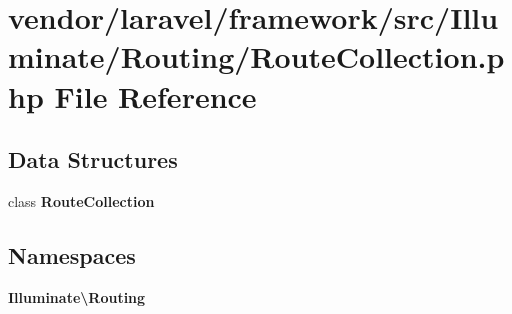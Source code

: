 \section{vendor/laravel/framework/src/\+Illuminate/\+Routing/\+Route\+Collection.php File Reference}
\label{laravel_2framework_2src_2_illuminate_2_routing_2_route_collection_8php}
\subsection*{Data Structures}
\begin{DoxyCompactItemize}
\item 
class {\bf Route\+Collection}
\end{DoxyCompactItemize}
\subsection*{Namespaces}
\begin{DoxyCompactItemize}
\item 
 {\bf Illuminate\textbackslash{}\+Routing}
\end{DoxyCompactItemize}
